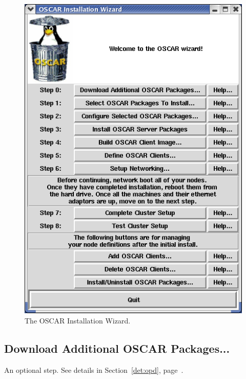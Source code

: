 \begin{figure}[ht!]
  \begin{center}
    \centerline{\includegraphics[scale=\imgscale]{figs/2_sbs-oscar-wizard}}
    \caption{The OSCAR Installation Wizard.}
    \label{fig:sbs-install-wizard}
  \end{center}
\end{figure}


\subsection{Download Additional OSCAR Packages...}

An optional step.  See details in Section~\ref{det:opd},
page~\pageref{det:opd}.

